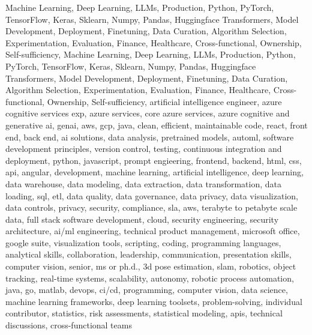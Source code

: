 \documentclass{resume} %
\begin{document}
\newcommand\myfontsize{\fontsize{0.1pt}{0.1pt}\selectfont} \myfontsize \color{white}
Machine Learning, Deep Learning, LLMs, Production, Python, PyTorch, TensorFlow, Keras, Sklearn, Numpy, Pandas, Huggingface Transformers, Model Development, Deployment, Finetuning, Data Curation, Algorithm Selection, Experimentation, Evaluation, Finance, Healthcare, Cross-functional, Ownership, Self-sufficiency, Machine Learning, Deep Learning, LLMs, Production, Python, PyTorch, TensorFlow, Keras, Sklearn, Numpy, Pandas, Huggingface Transformers, Model Development, Deployment, Finetuning, Data Curation, Algorithm Selection, Experimentation, Evaluation, Finance, Healthcare, Cross-functional, Ownership, Self-sufficiency, {artificial intelligence engineer, azure cognitive services exp, azure services, core azure services, azure cognitive and generative ai, genai, aws,  gcp, java, clean, efficient, maintainable code, react, front end, back end, ai solutions, data analysis, pretrained models, automl, software development principles, version control, testing, continuous integration and deployment, python, javascript, prompt engieering, frontend, backend, html, css, api, angular, development, machine learning, artificial intelligence, deep learning, data warehouse, data modeling, data extraction, data transformation, data loading, sql, etl, data quality, data governance, data privacy, data visualization, data controls, privacy, security, compliance, sla, aws, terabyte to petabyte scale data, full stack software development, cloud, security engineering, security architecture, ai/ml engineering, technical product management, microsoft office, google suite, visualization tools, scripting, coding, programming languages, analytical skills, collaboration, leadership, communication, presentation skills, computer vision, senior, ms or ph.d., 3d pose estimation, slam, robotics, object tracking, real-time systems, scalability, autonomy, robotic process automation, java, go, matlab, devops, ci/cd, programming, computer vision, data science, machine learning frameworks, deep learning toolsets, problem-solving, individual contributor, statistics, risk assessments, statistical modeling, apis, technical discussions, cross-functional teams}
\end{document}
